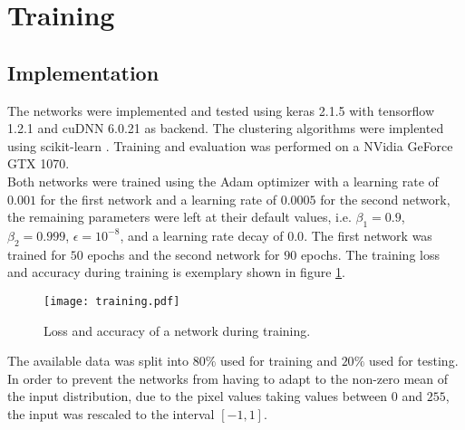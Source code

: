 \section{Training}

\subsection{Implementation}
The networks were implemented and tested using keras 2.1.5 \cite{chollet2015keras} with tensorflow 1.2.1 \cite{tensorflow2015-whitepaper} and cuDNN 6.0.21 \cite{Chetlur2014} as backend. The clustering algorithms were implented using scikit-learn \cite{scikit-learn}. Training and evaluation was performed on a NVidia GeForce GTX 1070.\\

Both networks were trained using the Adam optimizer with a learning rate of $0.001$ for the first network and a learning rate of $0.0005$ for the second network, the remaining parameters were left at their default values, i.e. $\beta_1=0.9$, $\beta_2=0.999$, $\epsilon=10^{-8}$, and a learning rate decay of $0.0$. The first network was trained for $50$ epochs and the second network for $90$ epochs. The training loss and accuracy during training is exemplary shown in figure \ref{fig:Training}. \\

\begin{figure}
\centering
\texttt{[image: training.pdf]}
\caption{Loss and accuracy of a network during training.}
\label{fig:Training}
\end{figure}

The available data was split into $80\%$ used for training and $20\%$ used for testing. In order to prevent the networks from having to adapt to the non-zero mean of the input distribution, due to the pixel values taking values between $0$ and $255$, the input was rescaled to the interval $[-1,1]$. \\

%

















